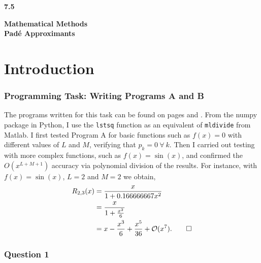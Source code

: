 \documentclass[12pt, a4paper]{article}
\begin{document}
	
	\setlength{\parindent}{0pt}
	\captionsetup{justification=centering}
	\lstset{
		showstringspaces=false	
	}
	
	
	\begin{titlepage}
		\LARGE
		\textbf{7.5}
		\begin{center}
			\vspace*{7cm}
			
			\LARGE
			\textbf{Mathematical Methods}
			\\
			\vspace{1cm}
			\textbf{Pad\'e Approximants}
			
			\vspace{0.5cm}
		\end{center}
	\end{titlepage}

\section{Introduction}	
	
\subsubsection*{Programming Task: Writing Programs A and B}

The programs written for this task can be found on pages \pageref{Program_A} and
\pageref{Program_B}. From the numpy package in Python, I use the \texttt{lstsq} function
as an equivalent of \texttt{mldivide} from Matlab. I first tested Program A for basic
functions such as $f(x) = 0$ with different values of $L$ and $M$, verifying that
$p_{k} = 0 ~ \forall ~ k$. Then I carried out testing
with more complex functions, such as $f(x) = \sin(x)$, and confirmed the $O(x^{L+M+1})$
accuracy via polynomial division of the results. For instance, with
$f(x) = \sin(x)$, $L = 2$ and $M = 2$ we obtain,
\begin{align*}
	R_{2,3}(x) & = \frac{x}{1+0.166666667x^{2}}\\ 
	& = \frac{x}{1+\frac{x^{2}}{6}} \\
	& = x - \frac{x^{3}}{6} + \frac{x^{5}}{36}+\mathcal{O}(x^{7}). \qed
\end{align*}



\subsubsection*{Question 1}
\end{document}
